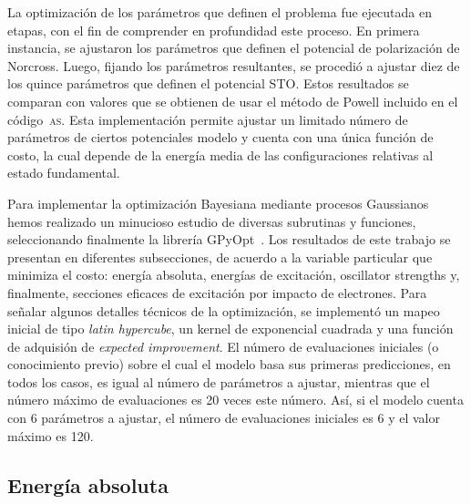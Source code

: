 La optimización de los parámetros que definen el problema fue ejecutada 
en etapas, con el fin de comprender en profundidad este proceso. En 
primera instancia, se ajustaron los parámetros que definen el potencial 
de polarización de Norcross. Luego, fijando los parámetros resultantes, 
se procedió a ajustar diez de los quince parámetros que definen el 
potencial STO. Estos resultados se comparan con valores que se obtienen 
de usar el método de Powell incluido en el código~\textsc{as}. Esta 
implementación permite ajustar un limitado número de parámetros de 
ciertos potenciales modelo y cuenta con una única función de costo, la
cual depende de la energía media de las configuraciones relativas al 
estado fundamental.

Para implementar la optimización Bayesiana mediante procesos Gaussianos 
hemos realizado un minucioso estudio de diversas subrutinas y funciones, 
seleccionando finalmente la librería GPyOpt~\cite{GPyOpt}. Los 
resultados de este trabajo se presentan en diferentes subsecciones, de 
acuerdo a la variable particular que minimiza el costo: energía 
absoluta, energías de excitación, oscillator strengths y, finalmente, 
secciones eficaces de excitación por impacto de electrones. 
Para señalar algunos detalles técnicos de la optimización, 
se implementó un mapeo inicial de tipo \textit{latin hypercube}, un 
kernel de exponencial cuadrada y una función de adquisión de 
\textit{expected improvement}. El número de evaluaciones 
iniciales (o conocimiento previo) sobre el cual el modelo basa sus 
primeras predicciones, en todos los casos, es igual al número de 
parámetros a ajustar, mientras que el número máximo de evaluaciones es 
20 veces este número. Así, si el modelo cuenta con 6 parámetros a 
ajustar, el número de evaluaciones iniciales es 6 y el valor máximo es 
120.

\subsection{Energía absoluta}

